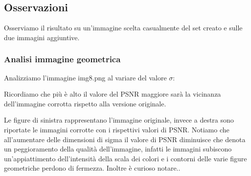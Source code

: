 \subsection{Osservazioni}
Osserviamo il risultato su un'immagine scelta casualmente del set creato e sulle due immagini aggiuntive.
\subsubsection{Analisi immagine geometrica}
Analizziamo l'immagine img8.png al variare del valore $\sigma$:

Ricordiamo che più è alto il valore del PSNR maggiore sarà la vicinanza dell'immagine corrotta rispetto alla versione originale. 

Le figure di sinistra rappresentano l'immagine originale, invece a destra sono riportate le immagini corrotte con i rispettivi valori di PSNR. 
Notiamo che all'aumentare delle dimensioni di sigma il valore di PSNR diminuisce che denota un peggioramento della qualità dell'immagine, 
infatti le immagini subiscono un'appiattimento dell'intensità della scala dei colori e i contorni delle varie figure geometriche perdono di fermezza. 
Inoltre è curioso notare.. %

